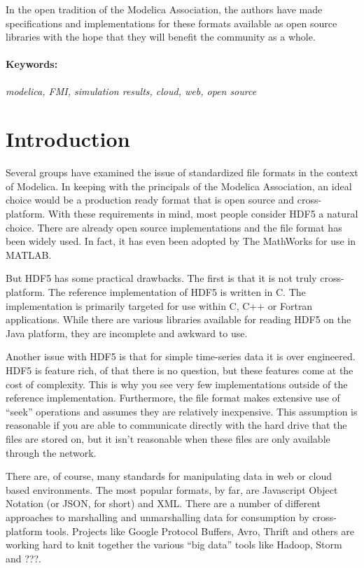 \documentclass[11pt,a4paper,twocolumn]{article}
\begin{document}
In the open tradition of the Modelica Association, the authors have
made specifications and implementations for these formats available as
open source libraries with the hope that they will benefit the
community as a whole.

\paragraph{Keywords:}\emph{modelica, FMI, simulation results,
  cloud, web, open source}

\section{Introduction}
\label{sec:intro}

Several groups have examined the issue of standardized file formats
\cite{AndreasHDF5,GallHDF5} in the context of Modelica.  In keeping
with the principals of the Modelica Association, an ideal choice would
be a production ready format that is open source and cross-platform.
With these requirements in mind, most people consider HDF5 a natural
choice.  There are already open source implementations and the file
format has been widely used.  In fact, it has even been adopted by The
MathWorks for use in MATLAB.

But HDF5 has some practical drawbacks.  The first is that it is not
truly cross-platform.  The reference implementation of HDF5 is written
in C.  The implementation is primarily targeted for use within C, C++
or Fortran applications.  While there are various libraries available
for reading HDF5 on the Java platform\cite{HDFJava}, they are
incomplete and awkward to use.

Another issue with HDF5 is that for simple time-series data it is over
engineered.  HDF5 is feature rich, of that there is no question, but
these features come at the cost of complexity.  This is why you see
very few implementations outside of the reference implementation.
Furthermore, the file format makes extensive use of ``seek''
operations and assumes they are relatively inexpensive.  This
assumption is reasonable if you are able to communicate directly with
the hard drive that the files are stored on, but it isn't reasonable
when these files are only available through the network.

There are, of course, many standards for manipulating data in web or
cloud based environments.  The most popular formats, by far, are
Javascript Object Notation (or JSON, for short) and XML.  There are a
number of different approaches to marshalling and unmarshalling data
for consumption by cross-platform tools.  Projects like Google
Protocol Buffers\cite{GPB}, Avro\cite{Avro}, Thrift\cite{Thrift} and
others are working hard to knit together the various ``big data''
tools like Hadoop\cite{Hadoop}, Storm\cite{Storm} and ???.
\end{document}
